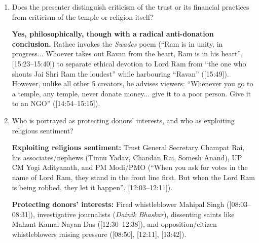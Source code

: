 \documentclass[10pt,a4paper]{article}
\begin{document}
\begin{enumerate}[leftmargin=1.5em, itemsep=6pt, topsep=4pt]
  \item Does the presenter distinguish criticism of the trust or its financial practices from criticism of the temple or religion itself?\par\smallskip
  \textbf{Yes, philosophically, though with a radical anti-donation conclusion.} Rathee invokes the \emph{Swades} poem (``Ram is in unity, in progress... Whoever takes out Ravan from the heart, Ram is in his heart'', [15:23--15:40]) to separate ethical devotion to Lord Ram from ``the one who shouts Jai Shri Ram the loudest'' while harbouring ``Ravan'' ([15:49]). However, unlike all other 5 creators, he advises viewers: ``Whenever you go to a temple, any temple, never donate money... give it to a poor person. Give it to an NGO'' ([14:54--15:15]).
  \item Who is portrayed as protecting donors' interests, and who as exploiting religious sentiment?\par\smallskip
  \textbf{Exploiting religious sentiment:} Trust General Secretary Champat Rai, his associates/nephews (Tinnu Yadav, Chandan Rai, Somesh Anand), UP CM Yogi Adityanath, and PM Modi/PMO (``When you ask for votes in the name of Lord Ram, they stand in the front line first. But when the Lord Ram is being robbed, they let it happen'', [12:03--12:11]).

  \textbf{Protecting donors' interests:} Fired whistleblower Mahipal Singh ([08:03--08:31]), investigative journalists (\emph{Dainik Bhaskar}), dissenting saints like Mahant Kamal Nayan Das ([12:30--12:38]), and opposition/citizen whistleblowers raising pressure ([08:50], [12:11], [13:42]).
\end{enumerate}
\end{document}
